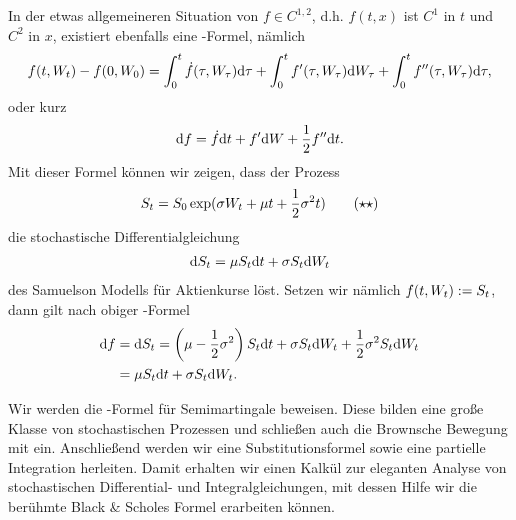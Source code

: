 In der etwas allgemeineren Situation von $f\in C^{1,2}$, d.h. $f(t,x)$ ist
$C^1$ in $t$ und $C^2$ in $x$, existiert ebenfalls eine \Ito-Formel, nämlich
\begin{align*}
f(t,W_t) - f(0,W_0) = \int_0^t \dot{f}(\tau,W_\tau)\mathrm{d} \tau + \int_0^t
f'(\tau,W_\tau)\mathrm{d} W_\tau + \int_0^t f''(\tau,W_\tau)\mathrm{d} \tau, 
\end{align*}
oder kurz
\begin{align*}
\mathrm{d} f = \dot f \mathrm{d} t + f' \mathrm{d} W + \frac{1}{2} f'' \mathrm{d} t.
\end{align*}
Mit dieser Formel können wir zeigen, dass der Prozess
\begin{align*}
S_t = S_0\exp(\sigma W_t + \mu t + \frac{1}{2}\sigma^2
t)\tag{\ensuremath{\star\star}}
\end{align*}
die stochastische Differentialgleichung
\begin{align*}
\mathrm{d} S_t = \mu S_t \mathrm{d} t + \sigma S_t \mathrm{d} W_t
\end{align*}
des Samuelson Modells für Aktienkurse löst. Setzen wir nämlich $f(t,W_t) :=
S_t$, dann gilt nach obiger \Ito-Formel
\begin{align*}
\mathrm{d} f &= \mathrm{d} S_t = \left(\mu-\frac{1}{2}\sigma^2 \right)S_t \mathrm{d} t + \sigma S_t
\mathrm{d} W_t + \frac{1}{2}\sigma^2 S_t\mathrm{d} W_t\\
& = \mu S_t \mathrm{d} t + \sigma S_t \mathrm{d} W_t.
\end{align*} 

Wir werden die \Ito-Formel für Semimartingale beweisen. 
Diese bilden eine große Klasse von
stochastischen Prozessen und schließen auch die Brownsche Bewegung
mit ein. Anschließend werden wir eine Substitutionsformel sowie eine partielle Integration herleiten. Damit erhalten
wir einen Kalkül zur eleganten Analyse von stochastischen Differential- und
Integralgleichungen, mit dessen Hilfe wir die berühmte
Black \& Scholes Formel erarbeiten können.
